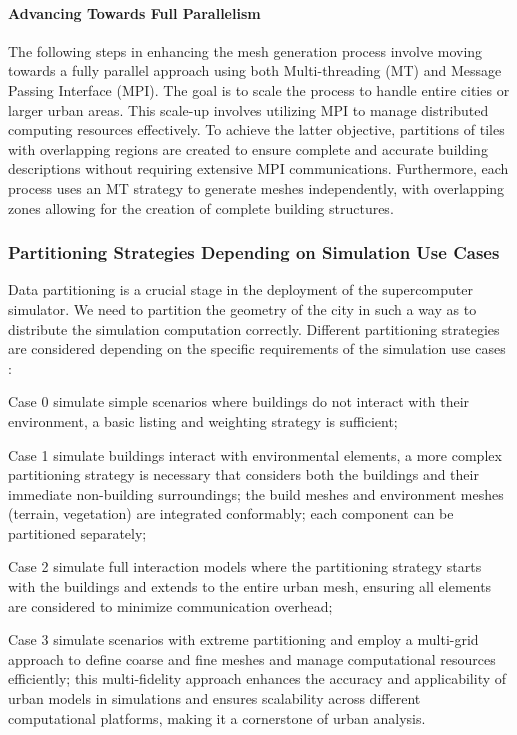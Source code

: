 \documentclass[runningheads]{llncs}
\begin{document}
\paragraph{Advancing Towards Full Parallelism}
The following steps in enhancing the mesh generation process involve moving towards a fully parallel approach using both Multi-threading (MT) and Message Passing Interface (MPI). The goal is to scale the process to handle entire cities or larger urban areas. This scale-up involves utilizing MPI to manage distributed computing resources effectively. To achieve the latter objective, partitions of tiles with overlapping regions are created to ensure complete and accurate building descriptions without requiring extensive MPI communications. Furthermore, each process uses an MT strategy to generate meshes independently, with overlapping zones allowing for the creation of complete building structures.

\subsubsection{Partitioning Strategies Depending on Simulation Use Cases}

Data partitioning is a crucial stage in the deployment of the supercomputer simulator. We need to partition the geometry of the city in such a way as to distribute the simulation computation correctly.
Different partitioning strategies are considered depending on the specific requirements of the simulation use cases :
\begin{inparadesc}
\item[Case 0] simulate simple scenarios where buildings do not interact with their environment, a basic listing and weighting strategy is sufficient;
\item[Case 1] simulate buildings interact with environmental elements, a more complex partitioning strategy is necessary that considers both the buildings and their immediate non-building surroundings; the build meshes and environment meshes (terrain, vegetation) are integrated conformably; each component can be partitioned separately;
\item[Case 2] simulate full interaction models where the partitioning strategy starts with the buildings and extends to the entire urban mesh, ensuring all elements are considered to minimize communication overhead;
\item[Case 3] simulate scenarios with extreme partitioning and employ a multi-grid approach to  define coarse and fine meshes and manage computational resources efficiently; this multi-fidelity approach enhances the accuracy and applicability of urban models in simulations and ensures scalability across different computational platforms, making it a cornerstone of urban analysis.
\end{inparadesc}
\end{document}
